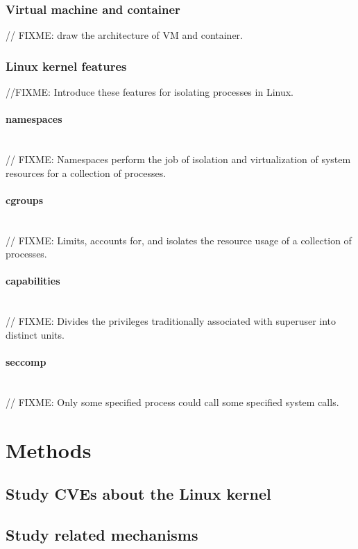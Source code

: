 \documentclass[12pt,a4paper,oneside,draft]{IEEEconf}
\begin{document}
\subsubsection{Virtual machine and container}
// FIXME: draw the architecture of VM and container.

\subsubsection{Linux kernel features}
//FIXME: Introduce these features for isolating processes in Linux.

\paragraph{namespaces}\mbox{}\\
// FIXME: Namespaces perform the job of isolation and virtualization of system resources
for a collection of processes.\cite{Road_Ahead}

\paragraph{cgroups}\mbox{}\\
// FIXME: Limits, accounts for, and isolates the resource usage of a collection of processes.
\cite{cgroup_wiki}

\paragraph{capabilities}\mbox{}\\
// FIXME: Divides the privileges traditionally associated with superuser into distinct
units.

\paragraph{seccomp}\mbox{}\\
// FIXME: Only some specified process could call some specified system calls.


\section{Methods}
\subsection{Study CVEs about the Linux kernel}
\subsection{Study related mechanisms}
\end{document}
